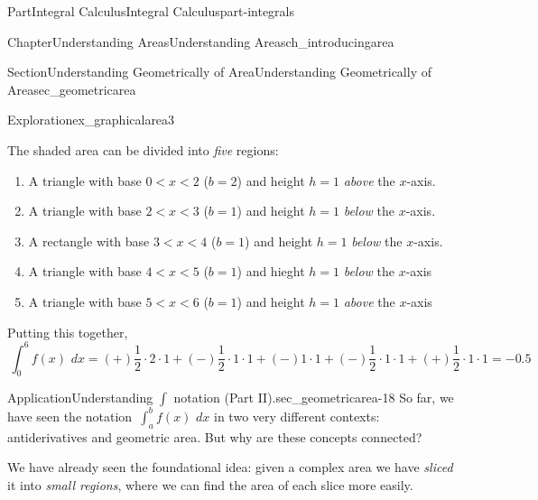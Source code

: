 \documentclass[oneside,10pt,]{tufte-book}
\numberwithin{equation}{chapter}
\newcommand{\intdx}[1]{{\,\int#1\,\,dx}}
\newcommand{\lt}{<}
\begin{document}
\begin{partptx}{Part}{Integral Calculus}{}{Integral Calculus}{}{}{part-integrals}
\begin{chapterptx}{Chapter}{Understanding Areas}{}{Understanding Areas}{}{}{ch_introducingarea}
\begin{sectionptx}{Section}{Understanding Geometrically of Area}{}{Understanding Geometrically of Area}{}{}{sec_geometricarea}
\begin{exploration}{Exploration}{}{ex_graphicalarea3}
\begin{enumerate}[font=\bfseries,label=(\alph*),ref=\alph*]
\begin{image}{0.25}{0.5}{0.25}{}
{
}%
\end{image}%
The shaded area can be divided into \emph{five} regions:%
\begin{enumerate}
\item{}A  triangle with base \(0\lt x\lt 2\) (\(b=2\)) and height \(h=1\) \emph{above} the \(x\)-axis.%
\item{}A triangle with base \(2\lt x\lt 3\) (\(b=1\)) and height \(h=1\) \emph{below} the \(x\)-axis.%
\item{}A rectangle with base \(3\lt x\lt 4\) (\(b=1\)) and height \(h=1\) \emph{below} the \(x\)-axis.%
\item{}A triangle with base \(4\lt x\lt 5\) (\(b=1\)) and hieght \(h=1\) \emph{below} the \(x\)-axis%
\item{}A triangle with base \(5\lt x\lt 6\) (\(b=1\)) and height \(h=1\) \emph{above} the \(x\)-axis%
\end{enumerate}
Putting this together,%
\begin{equation*}
\intdx{_0^6 f(x) } = (+) \frac{1}{2}\cdot 2 \cdot 1 + (-)\frac{1}{2}\cdot 1 \cdot 1 + (-)1\cdot 1 + (-)\frac{1}{2}\cdot 1\cdot 1 + (+)\frac{1}{2}\cdot 1 \cdot 1  = -0.5
\end{equation*}
%
\end{enumerate}%
\end{exploration}%
\begin{insight}{Application}{Understanding \(\int\) notation (Part II).}{sec_geometricarea-18}%
So far, we have seen the notation \(\intdx{_a^b f(x)}\) in two very different contexts: antiderivatives and geometric area. But why are these concepts connected?%
\par
We have already seen the foundational idea: given a complex area we have \emph{sliced} it into \emph{small regions}, where we can find the area of each slice more easily.%

\end{insight}
\end{sectionptx}
\end{chapterptx}
\end{partptx}
\end{document}
